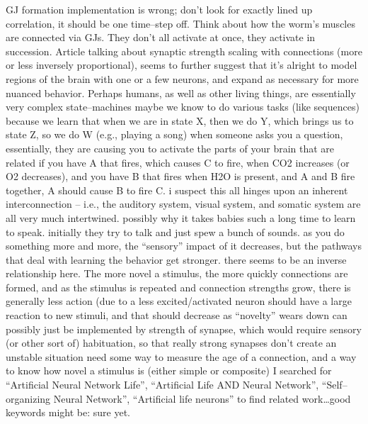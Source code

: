 \documentclass[11pt, a4paper, oneside]{article}   	%
\begin{document}
\begin{outline}
\point GJ formation implementation is wrong; don't look for exactly lined up correlation, it should be one time--step off. Think about how the worm's muscles are connected via GJs. They don't all activate at once, they activate in succession.
\point Article talking about synaptic strength scaling with connections (more or less inversely proportional), seems to further suggest that it's alright to model regions of the brain with one or a few neurons, and expand as necessary for more nuanced behavior.
\point Perhaps humans, as well as other living things, are essentially very complex state--machines
    \subpoint maybe we know to do various tasks (like sequences) because we learn that when we are in state X, then we do Y, which brings us to state Z, so we do W (e.g., playing a song)
\point when someone asks you a question, essentially, they are causing you to activate the parts of your brain that are related 
\point if you have A that fires, which causes C to fire, when CO2 increases (or O2 decreases), and you have B that fires when H2O is present, and A and B fire together, A should cause B to fire C.
    \subpoint i suspect this all hinges upon an inherent interconnection  -- i.e., the auditory system, visual system, and somatic system are all very much intertwined.
        \subsubpoint possibly why it takes babies such a long time to learn to speak. initially they try to talk and just spew a bunch of sounds.
\point as you do something more and more, the ``sensory'' impact of it decreases, but the pathways that deal with learning the behavior get stronger.
    \subpoint there seems to be an inverse relationship here. The more novel a stimulus, the more quickly connections are formed, and as the stimulus is repeated and connection strengths grow, there is generally less action (due to a less excited/activated neuron
        \subsubpoint should have a large reaction to new stimuli, and that should decrease as ``novelty'' wears down
            \supersubpoint can possibly just be implemented by strength of synapse, which would require sensory (or other sort of) habituation, so that really strong synapses don't create an unstable situation
        \subsubpoint need some way to measure the age of a connection, and a way to know how novel a stimulus is (either simple or composite)
\point I searched for ``Artificial Neural Network Life'', ``Artificial Life AND Neural Network'', ``Self--organizing Neural Network'', ``Artificial life neurons'' to find related work\ldots good keywords might be:
    \subpoint \ldotsnot sure yet.
\end{outline}
\end{document}
